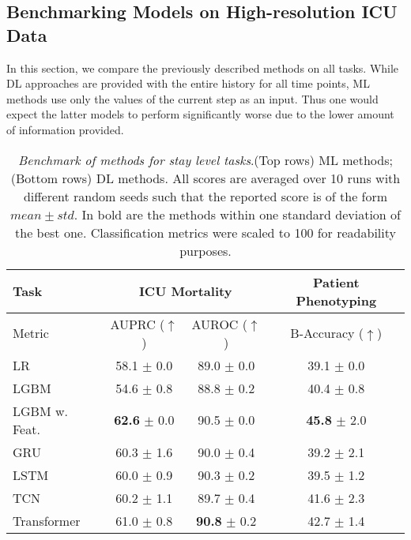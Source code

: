 \documentclass{article}
\begin{document}
\subsection{Benchmarking Models on High-resolution ICU Data}
In this section, we compare the previously described methods on all tasks. While DL approaches are provided with the entire history for all time points, ML methods use only the values of the current step as an input. Thus one would expect the latter models to perform significantly worse due to the lower amount of information provided.
\begin{table}[!ht]
    \footnotesize
    \centering
    \caption{\textit{Benchmark of methods for stay level tasks}.(Top rows) ML methods; (Bottom rows) DL methods. All scores are averaged over 10 runs with different random seeds such that the reported score is of the form $mean \pm std$. In bold are the methods within one standard deviation of the best one. Classification metrics were scaled to 100 for readability purposes.}
\begin{tabular}{l|cc|c}
\toprule
Task & \multicolumn{2}{c|}{ICU Mortality} &     Patient Phenotyping  \\
\midrule
Metric & AUPRC ($\uparrow$) & AUROC ($\uparrow$) & B-Accuracy ($\uparrow$) \\
\midrule
LR                 &     58.1 $\pm$ 0.0 &     89.0 $\pm$ 0.0 &          39.1 $\pm$ 0.0\\
LGBM               &     54.6 $\pm$ 0.8 &     88.8 $\pm$ 0.2 &          40.4 $\pm$ 0.8  \\
LGBM w. Feat.      &     \textbf{62.6} $\pm$ 0.0 &     90.5 $\pm$ 0.0 &          \textbf{45.8} $\pm$ 2.0  \\
\midrule
\midrule
GRU                &     60.3 $\pm$ 1.6 &     90.0 $\pm$ 0.4 &          39.2 $\pm$ 2.1 \\
LSTM               &     60.0 $\pm$ 0.9 &     90.3 $\pm$ 0.2 &          39.5 $\pm$ 1.2  \\
TCN                &     60.2 $\pm$ 1.1 &     89.7 $\pm$ 0.4 &          41.6 $\pm$ 2.3  \\
Transformer        &     61.0 $\pm$ 0.8 &     \textbf{90.8} $\pm$ 0.2 &          42.7 $\pm$ 1.4 \\
\bottomrule
\end{tabular}

    \label{tab:stay-level}
\end{table}
\end{document}
